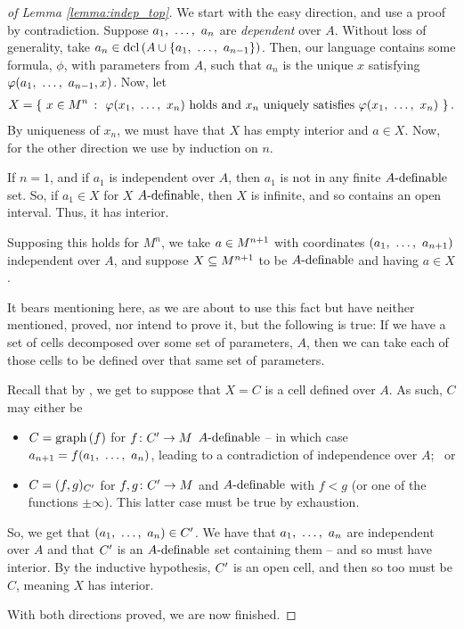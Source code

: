 \begin{proof}[of Lemma \ref{lemma:indep_top}]
  We start with the easy direction, and use a proof by contradiction. Suppose $\vonevm{a}{n}$ are \emph{dependent} over $A$. Without loss of generality, take $a_n \in \dcl{A \cup \{ \vonevm{a}{n-1} \}}$. Then, our language contains some formula, $\phi$, with parameters from $A$, such that $a_n$ is the unique $x$ satisfying $\phi(\vonevm{a}{n-1}, x)$. Now, let
    \begin{align*}
      X = \left\{ \ \aMn[x]{n} \ \colon \ \phi(\vonevm{x}{n}) \textrm{ holds and } x_n \textrm{ uniquely satisfies } \phi(\vonevm{x}{n}) \ \right\}.
    \end{align*}
  By uniqueness of $x_n$, we must have that $X$ has empty interior and $a \in X$. Now, for the other direction we use \cd by induction on $n$.

  If $n = 1$, and if $a_1$ is independent over $A$, then $a_1$ is not in any finite $\Adefnb$ set. So, if $a_1 \in X$ for $X$ $\Adefnb$, then $X$ is infinite, and so contains an open interval. Thus, it has \inhb interior.

  Supposing this holds for $M^n$, we take $\aMn[a]{n+1}$ with coordinates $(\vonevm{a}{n+1})$ independent over $A$, and suppose $\XMn[X]{n+1}$ to be $\Adefnb$ and having $a \in X$.
  \begin{svgraybox}
    It bears mentioning here, as we are about to use this fact but have neither mentioned, proved, nor intend to prove it, but the following is true: If we have a set of cells decomposed over some set of parameters, $A$, then we can take each of those cells to be defined over that same set of parameters.
  \end{svgraybox}
  Recall that by \cd, we get to suppose that $X = C$ is a cell defined over $A$. As such, $C$ may either be
    \begin{itemize}
      \item $C = \graph{f}$ for $\funcdom{f}{\pri{C}}{M}$ $\Adefnb$ -- in which case $a_{n+1} = f(\vonevm{a}{n})$, leading to a contradiction of independence over $A$; \ or

      \item $C = (f, g)_{\pri{C}}$ for $\funcdom{f,g}{\pri{C}}{M}$ \cont and $\Adefnb$ with $f < g$ (or one of the functions $\pm \infty$). This latter case must be true by exhaustion.
    \end{itemize}
  So, we get that $(\vonevm{a}{n}) \in \pri{C}$. We have that $\vonevm{a}{n}$ are independent over $A$ and that $\pri{C}$ is an $\Adefnb$ set containing them -- and so must have interior. By the inductive hypothesis, $\pri{C}$ is an open cell, and then so too must be $C$, meaning $X$ has \inhb interior.

  With both directions proved, we are now finished.
  \smartqed
\end{proof}

